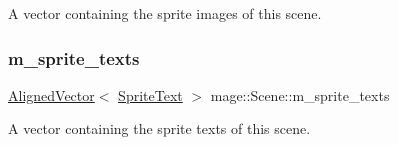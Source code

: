 A vector containing the sprite images of this scene. \hypertarget{classmage_1_1_scene_aa5f239ec1cf25e48461c638ea1668b42}{}\label{classmage_1_1_scene_aa5f239ec1cf25e48461c638ea1668b42} 
\subsubsection{\texorpdfstring{m\+\_\+sprite\+\_\+texts}{m\_sprite\_texts}}
{\footnotesize\ttfamily \hyperlink{namespacemage_a8664bfb5ce2179fc64eae9f82c8a5ba8}{Aligned\+Vector}$<$ \hyperlink{classmage_1_1_sprite_text}{Sprite\+Text} $>$ mage\+::\+Scene\+::m\+\_\+sprite\+\_\+texts\hspace{0.3cm}{\ttfamily [private]}}

A vector containing the sprite texts of this scene. 